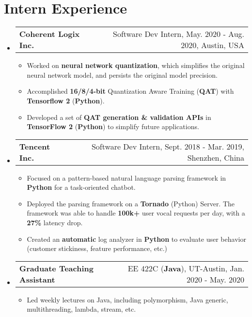 \documentclass[letterpaper,11pt]{article}
\makeatletter
\newcommand{\resumeItem}[1]{
  \item\small{
    {#1 \vspace{-2pt}}
  }
}
\newcommand{\internSubheading}[2]{
	\vspace{-1pt}\item
	\begin{tabular*}{0.97\textwidth}[t]{l@{\extracolsep{\fill}}r}
		\textbf{#1} & #2 \\
	\end{tabular*}\vspace{-6.5pt}
}
\newcommand{\resumeSubHeadingListStart}{\begin{itemize}[leftmargin=*]}
\newcommand{\resumeSubHeadingListEnd}{\end{itemize}}
\newcommand{\resumeItemListStart}{\begin{itemize}}
\newcommand{\resumeItemListEnd}{\end{itemize}\vspace{-5pt}}
\makeatother
\begin{document}
\section{Intern Experience}
  \resumeSubHeadingListStart
  	\internSubheading
  	{Coherent Logix Inc.}{Software Dev Intern, May. 2020 - Aug. 2020, Austin, USA}
  	\resumeItemListStart
  	\resumeItem
  	{Worked on \textbf{neural network quantization}, which simplifies the original neural network model, and persists the original model precision.}
  	\resumeItem
  	{Accomplished \textbf{16/8/4-bit} Quantization Aware Training (\textbf{QAT}) with \textbf{Tensorflow 2} (\textbf{Python}). }
  	\resumeItem
  	{Developed a set of \textbf{QAT generation \& validation APIs} in \textbf{TensorFlow 2} (\textbf{Python}) to simplify future applications. }
  	\resumeItemListEnd
  	
    \internSubheading
      {Tencent Inc.}{Software Dev Intern, Sept. 2018 - Mar. 2019, Shenzhen, China}
      \resumeItemListStart
      	\resumeItem
      	  {Focused on a pattern-based natural language parsing framework in \textbf{Python} for a task-oriented chatbot. }
      	\resumeItem
          {Deployed the parsing framework on a \textbf{Tornado} (Python) Server. The framework was able to handle \textbf{100k+} user vocal requests per day, with a \textbf{27\%} latency drop.} 
        \resumeItem
          {Created an \textbf{automatic} log analyzer in \textbf{Python} to evaluate user behavior (customer stickiness, feature performance, etc.)}
      \resumeItemListEnd
      \internSubheading
      {Graduate Teaching Assistant}
      {EE 422C (\textbf{Java}), UT-Austin, Jan. 2020 - May. 2020}
      \resumeItemListStart
      \resumeItem
      {Led weekly lectures on Java, including polymorphism, Java generic, multithreading, lambda, stream, etc. }
      \resumeItemListEnd
      \resumeSubHeadingListEnd
      
\end{document}

